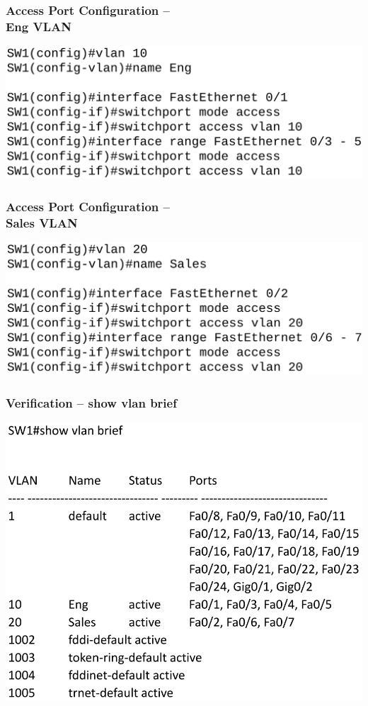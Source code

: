 \documentclass[pdflatex,compress,mathserif]{beamer}
\begin{document}
\begin{frame}
	\frametitle{Access Port Configuration –\\ Eng VLAN}
	\begin{center}
		\includegraphics[width=\linewidth]{img/img36}
	\end{center}
\end{frame}

\begin{frame}
	\frametitle{Access Port Configuration –\\ Sales VLAN}
	\begin{center}
		\includegraphics[width=\linewidth]{img/img37}
	\end{center}
\end{frame}

\begin{frame}
	\frametitle{Verification – show vlan brief}
	\begin{center}
		\includegraphics[width=0.8\linewidth]{img/img38}
	\end{center}
\end{frame}
\end{document}
